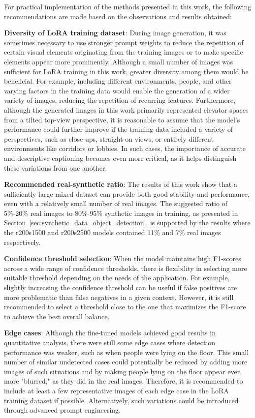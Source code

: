 For practical implementation of the methods presented in this work, the following recommendations are made based on the observations and results obtained:

\textbf{Diversity of LoRA training dataset}: During image generation, it was sometimes necessary to use stronger prompt weights to reduce the repetition of certain visual elements originating from the training images or to make specific elements appear more prominently. Although a small number of images was sufficient for LoRA training in this work, greater diversity among them would be beneficial. For example, including different environments, people, and other varying factors in the training data would enable the generation of a wider variety of images, reducing the repetition of recurring features. Furthermore, although the generated images in this work primarily represented elevator spaces from a tilted top-view perspective, it is reasonable to assume that the model's performance could further improve if the training data included a variety of perspectives, such as close-ups, straight-on views, or entirely different environments like corridors or lobbies. In such cases, the importance of accurate and descriptive captioning becomes even more critical, as it helps distinguish these variations from one another.

\textbf{Recommended real-synthetic ratio}: 
The results of this work show that a sufficiently large mixed dataset can provide both good stability and performance, even with a relatively small number of real images. The suggested ratio of 5\%-20\% real images to 80\%-95\% synthetic images in training, as presented in Section~\ref{sec:synthetic_data_object_detection}, is supported by the results where the r200s1500 and r200s2500 models contained 11\% and 7\% real images respectively.


\textbf{Confidence threshold selection}: When the model maintains high F1-scores across a wide range of confidence thresholds, there is flexibility in selecting more suitable threshold depending on the needs of the application. For example, slightly increasing the confidence threshold can be useful if false positives are more problematic than false negatives in a given context. However, it is still recommended to select a threshold close to the one that maximizes the F1-score to achieve the best overall balance.

\textbf{Edge cases}: Although the fine-tuned models achieved good results in quantitative analysis, there were still some edge cases where detection performance was weaker, such as when people were lying on the floor. This small number of similar undetected cases could potentially be reduced by adding more images of such situations and by making people lying on the floor appear even more "blurred," as they did in the real images.
Therefore, it is recommended to include at least a few representative images of each edge case in the LoRA training dataset if possible. Alternatively, such variations could be introduced through advanced prompt engineering.

